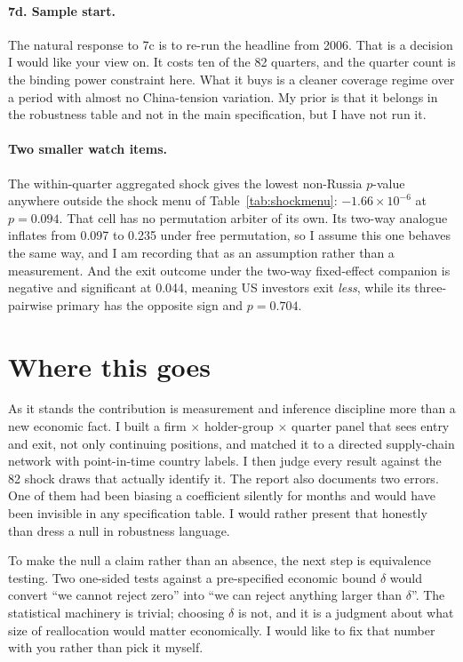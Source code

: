\documentclass[11pt]{article}
\begin{document}
\paragraph{7d. Sample start.} The natural response to 7c is to re-run the
headline from 2006. That is a decision I would like your view on. It costs ten
of the 82 quarters, and the quarter count is the binding power constraint here.
What it buys is a cleaner coverage regime over a period with almost no
China-tension variation. My prior is that it belongs in
the robustness table and not in the main specification, but I have not run it.

\paragraph{Two smaller watch items.} The within-quarter aggregated shock gives
the lowest non-Russia $p$-value anywhere outside the shock menu of
Table~\ref{tab:shockmenu}: $-1.66 \times 10^{-6}$ at $p = 0.094$. That cell has
no permutation arbiter of its own. Its two-way analogue inflates from 0.097 to
0.235 under free permutation, so I assume this one behaves the same way, and I
am recording that as an assumption rather than a measurement. And the
exit outcome under the two-way fixed-effect companion is negative and
significant at 0.044, meaning US investors exit \emph{less}, while its
three-pairwise primary has the opposite sign and $p = 0.704$.

\section{Where this goes}

As it stands the contribution is measurement and inference discipline more than
a new economic fact. I built a firm $\times$ holder-group $\times$ quarter
panel that sees entry and exit, not only continuing positions, and matched it
to a directed supply-chain network with point-in-time country labels. I then
judge every result against the 82 shock draws that actually identify it. The
report also documents two errors. One of them had been biasing a coefficient
silently for months and would have been invisible in any specification table.
I would rather present that honestly than dress a null in robustness language.

To make the null a claim rather than an absence, the next step is equivalence
testing. Two one-sided tests against a pre-specified economic bound $\delta$
would convert ``we cannot reject zero'' into ``we can reject anything larger
than $\delta$''. The statistical machinery is trivial; choosing $\delta$ is not, and
it is a judgment about what size of reallocation would matter economically. I
would like to fix that number with you rather than pick it myself.
\end{document}
